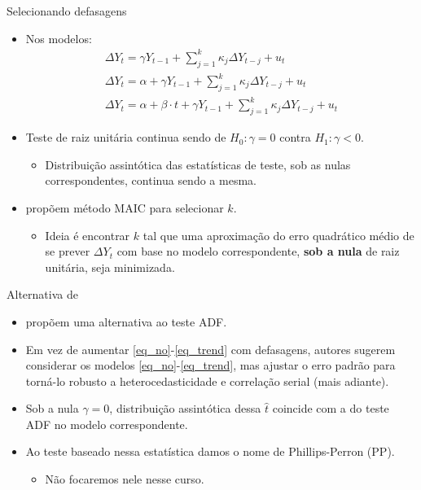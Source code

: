 \documentclass[11pt]{beamer}
\begin{document}
\begin{frame}{Selecionando defasagens}
		\begin{itemize}
			\item Nos modelos:
			\begin{equation}
				\tag{5}
		\begin{aligned}
			\Delta Y_t = \gamma Y_{t-1}  +\sum_{j=1}^k \kappa_j \Delta Y_{t-j} + u_t \\
			\Delta Y_t = \alpha + \gamma Y_{t-1}  +\sum_{j=1}^k \kappa_j \Delta Y_{t-j} + u_t
			\\
			\Delta Y_t = \alpha + \beta \cdot t + \gamma Y_{t-1} +  \sum_{j=1}^k\kappa_j \Delta Y_{t-j} + u_t
		\end{aligned}
	\end{equation}

			\item Teste de raiz unitária continua sendo de $H_0: \gamma = 0$ contra $H_1: \gamma < 0$.
			\begin{itemize}
				\vspace{-1em}
				\item Distribuição assintótica das estatísticas de teste, sob as nulas correspondentes, continua sendo a mesma.
			\end{itemize}
		\item \citet{Ng2001} propõem método MAIC para selecionar $k$.
		\begin{itemize}
			\item Ideia é encontrar $k$ tal que uma aproximação do erro quadrático médio de se prever $\Delta Y_t$ com base no modelo correspondente, \textbf{sob a nula} de raiz unitária, seja minimizada.
		\end{itemize}
	\end{itemize}
\end{frame}
\begin{frame}{Alternativa de \citet{Phillips1988}}
	\begin{itemize}
		\item \citet{Phillips1988} propõem uma alternativa ao teste ADF.
		\item Em vez de aumentar \eqref{eq_no}-\eqref{eq_trend} com defasagens, autores sugerem considerar os modelos \eqref{eq_no}-\eqref{eq_trend}, mas ajustar o erro padrão para torná-lo robusto a heterocedasticidade e correlação serial (mais adiante).
		\item Sob a nula $\gamma = 0$, distribuição assintótica dessa $\hat{t}$ coincide com a do teste ADF no modelo correspondente.
		\item Ao teste baseado nessa estatística damos o nome de Phillips-Perron (PP).
		\begin{itemize}
			\item Não focaremos nele nesse curso.
		\end{itemize} 
		
	\end{itemize}
\end{frame}
\end{document}
